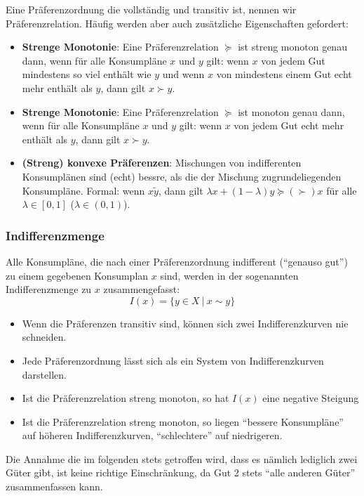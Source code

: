 Eine Präferenzordnung die vollständig und transitiv ist, nennen wir Präferenzrelation. Häufig werden aber auch zusätzliche Eigenschaften gefordert:
\begin{itemize}
	\item \textbf{Strenge Monotonie}: Eine Präferenzrelation $\succeq$ ist streng monoton genau dann, wenn für alle Konsumpläne $x$ und $y$ gilt: wenn $x$ von jedem Gut mindestens so viel enthält wie $y$ und wenn $x$ von mindestens einem Gut echt mehr enthält als $y$, dann gilt $x \succ y$. 
	\item \textbf{Strenge Monotonie}: Eine Präferenzrelation $\succeq$ ist monoton genau dann, wenn für alle Konsumpläne $x$ und $y$ gilt: wenn $x$ von jedem Gut echt mehr enthält als $y$, dann gilt $x \succ y$. 
	\item \textbf{(Streng) konvexe Präferenzen}: Mischungen von indifferenten Konsumplänen sind (echt) bessre, als die der Mischung zugrundeliegenden Konsumpläne. Formal: wenn $x \tilde y$, dann gilt $\lambda x + (1 - \lambda) y \succeq (\succ) x$ für alle $\lambda \in [0, 1]$ ($\lambda \in (0, 1)$).
\end{itemize}

\subsubsection*{Indifferenzmenge}

Alle Konsumpläne, die nach einer Präferenzordnung indifferent (\enquote{genauso gut}) zu einem gegebenen Konsumplan $x$ sind, werden in der sogenannten Indifferenzmenge zu $x$ zusammengefasst:
$$ I(x) = \big\{ y \in X ~|~x \sim y \big\} $$
\begin{itemize}
	\item Wenn die Präferenzen transitiv sind, können sich zwei Indifferenzkurven nie schneiden.
	\item Jede Präferenzordnung lässt sich als ein System von Indifferenzkurven darstellen.
	\item Ist die Präferenzrelation streng monoton, so hat $I(x)$ eine negative Steigung
	\item Ist die Präferenzrelation streng monoton, so liegen \enquote{bessere Konsumpläne} auf höheren Indifferenzkurven, \enquote{schlechtere} auf niedrigeren.
\end{itemize}

Die Annahme die im folgenden stets getroffen wird, dass es nämlich lediglich zwei Güter gibt, ist keine richtige Einschränkung, da Gut 2 stets \enquote{alle anderen Güter} zusammenfassen kann.

